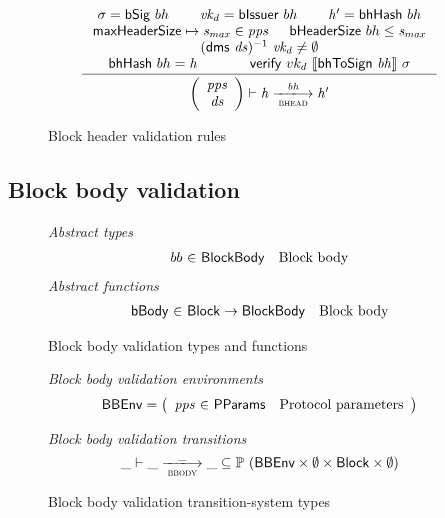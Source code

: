 \documentclass[11pt,a4paper]{article}
\newcommand{\powerset}[1]{\mathbb{P}~#1}
\newcommand{\var}[1]{\mathit{#1}}
\newcommand{\fun}[1]{\mathsf{#1}}
\newcommand{\type}[1]{\mathsf{#1}}
\newcommand{\trans}[2]{\xlongrightarrow[\textsc{#1}]{#2}}
\newcommand{\serialised}[1]{\llbracket \var{#1} \rrbracket}
\newcommand{\totalf}{\to}
\newcommand{\Block}{\type{Block}}
\newcommand{\ProtParams}{\type{PParams}} %
\newcommand{\bhdrsizename}{bHeaderSize}
\newcommand{\verifyname}{verify}
\newcommand{\bsigname}{bSig}
\newcommand{\bissuername}{bIssuer}
\newcommand{\verify}[3]{\fun{\verifyname} ~ #1 ~ #2 ~ #3}
\newcommand{\bhdrsize}[1]{\fun{\bhdrsizename} ~ #1}
\newcommand{\bsig}[1]{\fun{\bsigname} ~ #1}
\newcommand{\bissuer}[1]{\fun{\bissuername} ~ #1}
\begin{document}
\begin{figure}[ht]
  \begin{equation*}
    \inference
    { \sigma = \bsig{bh} & \var{vk_d} = \bissuer{bh} & \var{h'} = \bhhash{bh}
    \\ \maxheadersize \mapsto \var{s_{max}} \in \var{pps} & \bhdrsize{bh} \leq \var{s_{max}}
    \\  (\fun{dms} ~ \var{ds})^{-1} ~ \var{vk_d} \neq \emptyset
    \\ \bhprevhash{bh} = \var{h} & \verify{vk_d}{\serialised{\bhtosign{bh}}}{\sigma}
    }
    {
      \left(
        {\begin{array}{c}
          \var{pps} \\
          \var{ds} \\
        \end{array}}
      \right)
      \vdash
        {\var{h}}
      \trans{bhead}{\var{bh}}
        {\var{h'}}
    }
  \end{equation*}
  \caption{Block header validation rules}
  \label{fig:rules:bhead}
\end{figure}

\clearpage

\subsection{Block body validation}
\begin{figure}[ht]
  \emph{Abstract types}
  \begin{equation*}
    \begin{array}{r@{~\in~}lr}
    bb & \Bbody & \text{Block body}
    \end{array}
  \end{equation*}
  \emph{Abstract functions}
  \begin{equation*}
    \begin{array}{r@{~\in~}lr}
    \fun{\bbodyname} & \Block \totalf \Bbody & \text{Block body} \\
    \end{array}
  \end{equation*}
  \caption{Block body validation types and functions}
  \label{fig:defs:bbody}
\end{figure}

\begin{figure}[ht]
  \emph{Block body validation environments}
  \begin{equation*}
    \BBEnv =
    \left(
      \begin{array}{r@{~\in~}lr}
        \var{pps} & \ProtParams & \text{Protocol parameters} \\
      \end{array}
    \right)
  \end{equation*}

  \emph{Block body validation transitions}
  \begin{equation*}
    \_ \vdash \var{\_} \trans{bbody}{\_} \var{\_} \subseteq
    \powerset (\BBEnv \times \emptyset \times \Block \times \emptyset)
  \end{equation*}
  \caption{Block body validation transition-system types}
  \label{fig:ts-types:bbody}
\end{figure}
\end{document}
